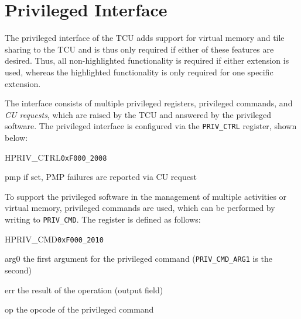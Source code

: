 \chapter{Privileged Interface}

The privileged interface of the TCU adds support for virtual memory and tile sharing to the TCU and is
thus only required if either of these features are desired. Thus, all non-highlighted functionality
is required if either extension is used, whereas the highlighted functionality is only required for
one specific extension.

The interface consists of multiple privileged registers, privileged commands, and \emph{CU
requests}, which are raised by the TCU and answered by the privileged software. The privileged
interface is configured via the \texttt{PRIV\_CTRL} register, shown below:

\setlength{\regWidth}{.95\textwidth}
\begin{register}{H}{PRIV\_CTRL}{\texttt{0xF000\_2008}}
  \regnewline%
  \begin{regdesc}\begin{reglist}
    \item[pmp] if set, PMP failures are reported via CU request
  \end{reglist}\end{regdesc}
\end{register}
\setlength{\regWidth}{\textwidth}

To support the privileged software in the management of multiple activities or virtual memory,
privileged commands are used, which can be performed by writing to \texttt{PRIV\_CMD}. The register
is defined as follows:

\begin{register}{H}{PRIV\_CMD}{\texttt{0xF000\_2010}}
  \regnewline%
  \begin{regdesc}\begin{reglist}
    \item[arg0] the first argument for the privileged command (\texttt{PRIV\_CMD\_ARG1} is the second)
    \item[err] the result of the operation (output field)
    \item[op] the opcode of the privileged command
  \end{reglist}\end{regdesc}
\end{register}

